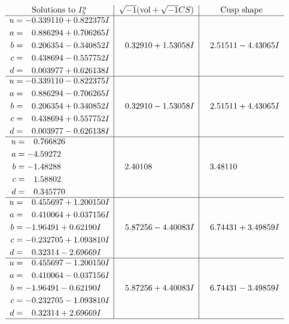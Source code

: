 \documentclass[1p]{elsarticle_modified}
\theoremstyle{definition}
\newcommand{\I}{\sqrt{-1}}
\begin{document}
$$\begin{array}{c|c|c}  
\text{Solutions to }I^u_{5}& \I (\text{vol} + \sqrt{-1}CS) & \text{Cusp shape}\\
 \hline 
\begin{aligned}
u &= -0.339110 + 0.822375 I \\
a &= \phantom{-}0.886294 + 0.706265 I \\
b &= \phantom{-}0.206354 - 0.340852 I \\
c &= \phantom{-}0.438694 - 0.557752 I \\
d &= \phantom{-}0.003977 + 0.626138 I\end{aligned}
 & \phantom{-}0.32910 + 1.53058 I & \phantom{-}2.51511 - 4.43065 I \\ \hline\begin{aligned}
u &= -0.339110 - 0.822375 I \\
a &= \phantom{-}0.886294 - 0.706265 I \\
b &= \phantom{-}0.206354 + 0.340852 I \\
c &= \phantom{-}0.438694 + 0.557752 I \\
d &= \phantom{-}0.003977 - 0.626138 I\end{aligned}
 & \phantom{-}0.32910 - 1.53058 I & \phantom{-}2.51511 + 4.43065 I \\ \hline\begin{aligned}
u &= \phantom{-}0.766826\phantom{ +0.000000I} \\
a &= -4.59272\phantom{ +0.000000I} \\
b &= -1.48288\phantom{ +0.000000I} \\
c &= \phantom{-}1.58802\phantom{ +0.000000I} \\
d &= \phantom{-}0.345770\phantom{ +0.000000I}\end{aligned}
 & \phantom{-}2.40108\phantom{ +0.000000I} & \phantom{-}3.48110\phantom{ +0.000000I} \\ \hline\begin{aligned}
u &= \phantom{-}0.455697 + 1.200150 I \\
a &= \phantom{-}0.410064 + 0.037156 I \\
b &= -1.96491 + 0.62190 I \\
c &= -0.232705 + 1.093810 I \\
d &= \phantom{-}0.32314 - 2.69669 I\end{aligned}
 & \phantom{-}5.87256 - 4.40083 I & \phantom{-}6.74431 + 3.49859 I \\ \hline\begin{aligned}
u &= \phantom{-}0.455697 - 1.200150 I \\
a &= \phantom{-}0.410064 - 0.037156 I \\
b &= -1.96491 - 0.62190 I \\
c &= -0.232705 - 1.093810 I \\
d &= \phantom{-}0.32314 + 2.69669 I\end{aligned}
 & \phantom{-}5.87256 + 4.40083 I & \phantom{-}6.74431 - 3.49859 I\\
 \hline 
 \end{array}$$\newpage\newpage\renewcommand{\arraystretch}{1}
\end{document}
